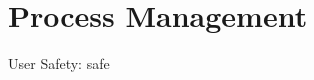 \documentclass[12pt]{report}
\begin{document}
\pagestyle{plain}
\setcounter{page}{3}
\setcounter{chapter}{1}
\chapter{Process Management}

User Safety: safe
\end{document}
